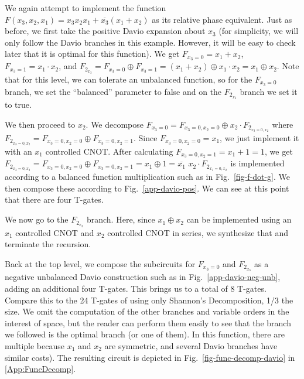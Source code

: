 \begin{example}
  \label{ex-davio}
  We again attempt to implement the function $F(x_3,x_2,x_1) = x_3x_2x_1 + \overline{x_3}(x_1 + x_2)$ as its
  relative phase equivalent. Just as before, we first take the positive Davio expansion about $x_3$ (for
  simplicity, we will only follow the Davio branches in this example. However, it will be easy to check later
  that it is optimal for this function). We get $F_{x_3=0} = x_1 + x_2$, $F_{x_3=1} = x_1 \cdot x_2$,
  and $F_{2_{x_3}} = F_{x_3=0} \oplus F_{x_3=1} = (x_1 + x_2) \oplus x_1 \cdot x_2 = x_1 \oplus x_2$.
  Note that for this level, we can tolerate an unbalanced function, so for the $F_{x_3=0}$ branch, we set the
  ``balanced'' parameter to false and on the $F_{2_{x_3}}$ branch we set it to true.

  We then proceed to $x_2$. We decompose $F_{x_3=0} = F_{x_3=0,x_2=0} \oplus x_2 \cdot F_{2_{x_3=0,x_2}}$ where $F_{2_{x_3=0,x_2}} = F_{x_3=0,x_2=0} \oplus F_{x_3=0,x_2=1}$. Since $F_{x_3=0,x_2=0} = x_1$, we just implement it with an $x_1$
  controlled CNOT. After calculating $F_{x_3=0,x_2=1} = x_1 + 1 = 1$, we get $F_{2_{x_3=0,x_2}} = F_{x_3=0,x_2=0} \oplus F_{x_3=0,x_2=1} = x_1 \oplus 1 = \overline{x_1}$ $x_2 \cdot F_{2_{x_3=0,x_2}}$ is implemented according to a balanced function multiplication such as in Fig.~\ref{fig-f-dot-g}. We then compose
these according to Fig.~\ref{app-davio-pos}. We can see at this point that
  there are four T-gates.

  We now go to the $F_{2_{x_3}}$ branch. Here, since $x_1 \oplus x_2$ can be implemented using an $x_1$ controlled CNOT and $x_2$ controlled CNOT
  in series, we synthesize that and terminate the recursion.

  Back at the top level, we compose the subcircuits for $F_{x_3=0}$ and $F_{2_{x_3}}$ as a negative unbalanced Davio construction such as in Fig.~\ref{app-davio-neg-unb}, adding an additional four
  T-gates. This brings us to a total of 8 T-gates. Compare this to the 24 T-gates of using only Shannon's Decomposition, 1/3 the size. We omit
  the computation of the other branches and variable orders in the interest of space, but the reader can perform them  easily to
  see that the branch we followed is the optimal branch (or one of them). In this function, there are multiple because $x_1$  and
  $x_2$ are symmetric, and several Davio branches have similar costs). 
  The resulting circuit is depicted in Fig.~\ref{fig-func-decomp-davio} in \ref{App:FuncDecomp}.

\end{example}

